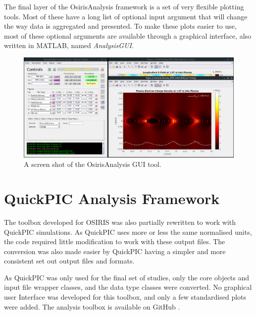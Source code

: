 The final layer of the OsirisAnalysis framework is a set of very flexible plotting tools.
Most of these have a long list of optional input argument that will change the way data is aggregated and presented.
To make these plots easier to use, most of these optional arguments are available through a graphical interface, also written in MATLAB, named \emph{AnalysisGUI}.

\begin{figure}[hbt]
    \centering
    \includegraphics[width=0.99\linewidth,trim={0mm 0mm 0mm 0mm},clip]{images/OsirisAnalysisGUI}
    \caption{\label{Fig:OAGUI} A screen shot of the OsirisAnalysis GUI tool.}
\end{figure}

\section{QuickPIC Analysis Framework}
\label{Tools:QA}

The toolbox developed for OSIRIS was also partially rewritten to work with QuickPIC simulations.
As QuickPIC uses more or less the same normalised units, the code required little modification to work with these output files.
The conversion was also made easier by QuickPIC having a simpler and more consistent set out output files and formats.

As QuickPIC was only used for the final set of studies, only the core objects and input file wrapper classes, and the data type classes were converted.
No graphical user Interface was developed for this toolbox, and only a few standardised plots were added.
The analysis toolbox is available on GitHub \cite{code:quickpic_analysis:2017}.

